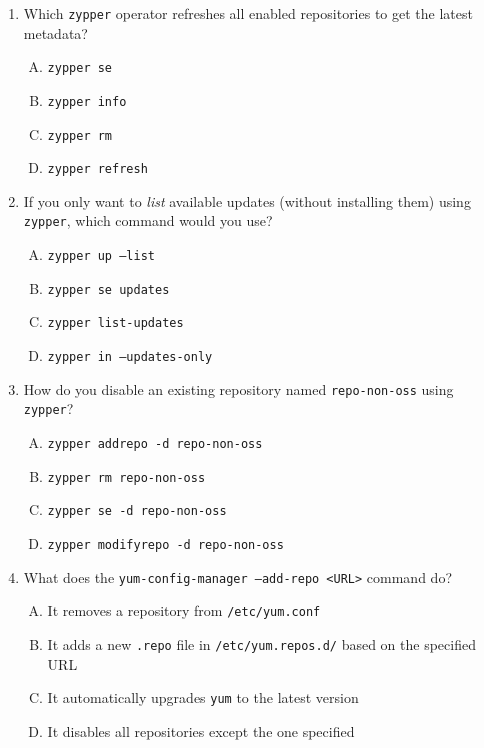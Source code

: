 \documentclass[a4paper]{report}
\begin{document}
\begin{enumerate}[1.]
    \item Which \texttt{zypper} operator refreshes all enabled repositories to get the latest metadata?  
    \begin{enumerate}[A)]
        \item \texttt{zypper se}  
        \item \texttt{zypper info}  
        \item \texttt{zypper rm}  
        \item \texttt{zypper refresh}  
    \end{enumerate}

    \item If you only want to \emph{list} available updates (without installing them) using \texttt{zypper}, which command would you use?  
    \begin{enumerate}[A)]
        \item \texttt{zypper up --list}  
        \item \texttt{zypper se updates}  
        \item \texttt{zypper list-updates}  
        \item \texttt{zypper in --updates-only}  
    \end{enumerate}

    \item How do you disable an existing repository named \texttt{repo-non-oss} using \texttt{zypper}?  
    \begin{enumerate}[A)]
        \item \texttt{zypper addrepo -d repo-non-oss}  
        \item \texttt{zypper rm repo-non-oss}  
        \item \texttt{zypper se -d repo-non-oss}  
        \item \texttt{zypper modifyrepo -d repo-non-oss}  
    \end{enumerate}

    \item What does the \texttt{yum-config-manager --add-repo <URL>} command do?  
    \begin{enumerate}[A)]
        \item It removes a repository from \texttt{/etc/yum.conf}  
        \item It adds a new \texttt{.repo} file in \texttt{/etc/yum.repos.d/} based on the specified URL  
        \item It automatically upgrades \texttt{yum} to the latest version  
        \item It disables all repositories except the one specified  
    \end{enumerate}


\end{enumerate}
\end{document}

